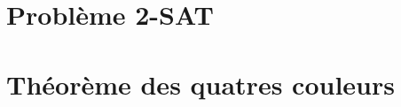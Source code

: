 \documentclass{tipe}
\begin{document}

\clearpage

\part{Problème 2-SAT}


\part{Théorème des quatres couleurs}




\end{document}
